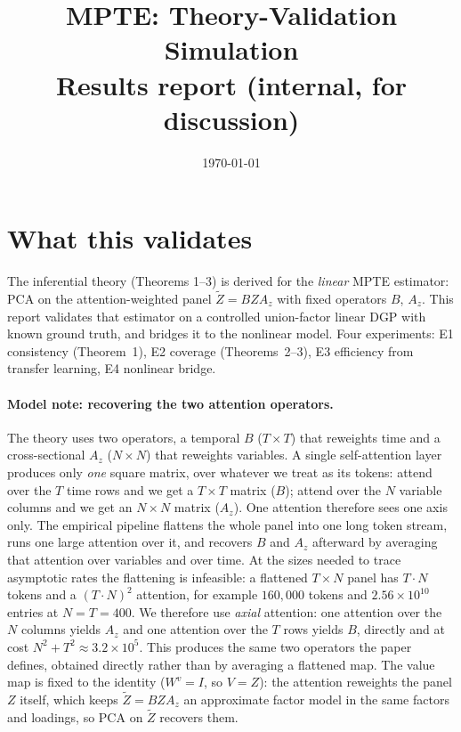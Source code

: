 \documentclass[11pt]{article}
\title{MPTE: Theory-Validation Simulation\\\large Results report (internal, for discussion)}
\author{}
\date{\today}
\begin{document}
\maketitle

\section{What this validates}
The inferential theory (Theorems 1--3) is derived for the \emph{linear} MPTE estimator: PCA on
the attention-weighted panel $\widetilde Z = B Z A_z$ with fixed operators $B$, $A_z$. This report
validates that estimator on a controlled union-factor linear DGP with known ground truth, and
bridges it to the nonlinear model. Four experiments: E1 consistency (Theorem~1), E2 coverage
(Theorems~2--3), E3 efficiency from transfer learning, E4 nonlinear bridge.

\paragraph{Model note: recovering the two attention operators.} The theory uses two operators, a
temporal $B$ ($T\times T$) that reweights time and a cross-sectional $A_z$ ($N\times N$) that
reweights variables. A single self-attention layer produces only \emph{one} square matrix, over
whatever we treat as its tokens: attend over the $T$ time rows and we get a $T\times T$ matrix
($B$); attend over the $N$ variable columns and we get an $N\times N$ matrix ($A_z$). One attention
therefore sees one axis only. The empirical pipeline flattens the whole panel into one long token
stream, runs one large attention over it, and recovers $B$ and $A_z$ afterward by averaging that
attention over variables and over time. At the sizes needed to trace asymptotic rates the
flattening is infeasible: a flattened $T\times N$ panel has $T\!\cdot\!N$ tokens and a
$(T\!\cdot\!N)^2$ attention, for example $160{,}000$ tokens and $2.56\times10^{10}$ entries at
$N=T=400$. We therefore use \emph{axial} attention: one attention over the $N$ columns yields $A_z$
and one attention over the $T$ rows yields $B$, directly and at cost $N^2+T^2\approx3.2\times10^5$.
This produces the same two operators the paper defines, obtained directly rather than by averaging a
flattened map. The value map is fixed to the identity ($W^v=I$, so $V=Z$): the attention reweights
the panel $Z$ itself, which keeps $\widetilde Z=BZA_z$ an approximate factor model in the same
factors and loadings, so PCA on $\widetilde Z$ recovers them.
\end{document}
